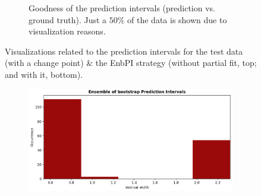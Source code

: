 \begin{figure}[ht]
\begin{subfigure}[b]{\textwidth}
        \caption{Goodness of the prediction intervals (prediction vs. ground truth). Just a $50\%$ of the data is shown due to visualization reasons.}
        \label{subfig:app-timeseries-intervals-goodness-cpoint}
    \end{subfigure}
    \caption{Visualizations related to the prediction intervals for the test data (with a change point) \& the EnbPI strategy (without partial fit, top; and with it, bottom).}
    \label{fig:app-timeseries-intervals-cpoint}
\end{figure}

\begin{figure}[ht]
    \centering
    \begin{subfigure}[b]{0.32\textwidth}
        \centering
        \includegraphics[width=1.15\textwidth, height=1.75\textwidth]{Figures/timeseries/with-change-point/width-occurrence-timeseries-problem-with-change-point.png}

\end{subfigure}
\end{figure}
